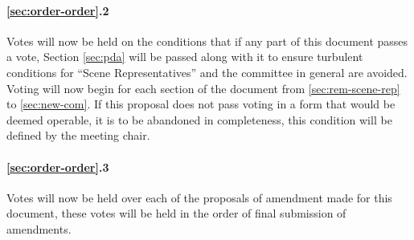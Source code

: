 \documentclass[10pt, a4paper]{article}
\begin{document}
\paragraph{\ref{sec:order-order}.2} Votes will now be held on the conditions that if any part of this document passes a vote, Section \ref{sec:pda} will be passed along with it to ensure turbulent conditions for ``Scene Representatives'' and the committee in general are avoided. Voting will now begin for each section of the document from \ref{sec:rem-scene-rep} to \ref{sec:new-com}. If this proposal does not pass voting in a form that would be deemed operable, it is to be abandoned in completeness, this condition will be defined by the meeting chair.

\paragraph{\ref{sec:order-order}.3\label{par:amending}} Votes will now be held over each of the proposals of amendment made for this document, these votes will be held in the order of final submission of amendments.
\end{document}
